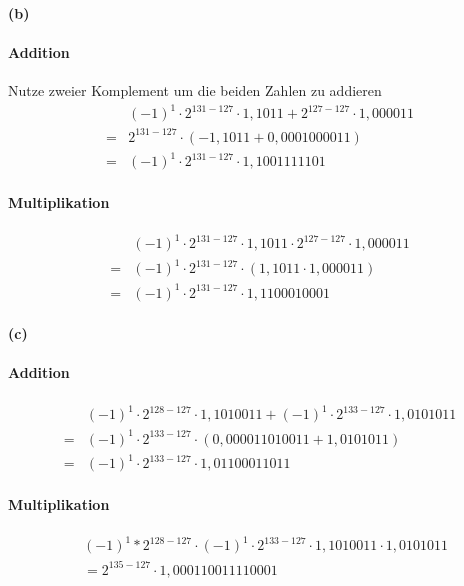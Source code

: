 \documentclass[a4paper]{article}
\begin{document}
\paragraph{(b)}
\paragraph{Addition}
Nutze zweier Komplement um die beiden Zahlen zu addieren
\begin{align*}
    &(-1)^1\cdot 2^{131-127} \cdot1,1011 + 2^{127-127}\cdot 1,000011\\
    =&2^{131-127}\cdot(-1,1011+0,0001000011)\\
    =&(-1)^1\cdot2^{131-127}\cdot 1,1001111101
\end{align*}
\paragraph{Multiplikation}
\begin{align*}
     &(-1)^1\cdot 2^{131-127} \cdot1,1011 \cdot 2^{127-127}\cdot 1,000011\\
     =&(-1)^1\cdot 2^{131-127}\cdot(1,1011\cdot1,000011)\\
     =&(-1)^1\cdot 2^{131-127}\cdot1,1100010001
\end{align*}

\paragraph{(c)}
\paragraph{Addition}
\begin{align*}
    &(-1)^1\cdot2^{128-127}\cdot1,1010011+(-1)^1\cdot2^{133-127}\cdot1,0101011\\
    =&(-1)^1\cdot2^{133-127}\cdot(0,000011010011+1,0101011)\\
    =&(-1)^1\cdot2^{133-127}\cdot1,01100011011
\end{align*}

\paragraph{Multiplikation}
\begin{align*}
    &(-1)^1*2^{128-127}\cdot(-1)^1\cdot2^{133-127}\cdot1,1010011\cdot1,0101011\\
    &=2^{135-127}\cdot1,000110011110001
\end{align*}
\end{document}
